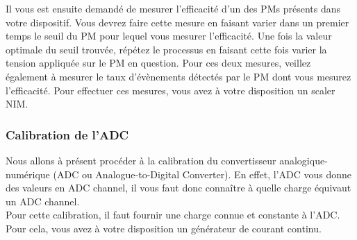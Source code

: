 Il vous est ensuite demandé de mesurer l'efficacité d'un des PMs présents dans votre dispositif. Vous devrez faire cette mesure en faisant varier dans un premier temps le seuil du PM pour lequel vous mesurer l'efficacité. Une fois la valeur optimale du seuil trouvée, répétez le processus en faisant cette fois varier la tension appliquée sur le PM en question. Pour ces deux mesures, veillez également à mesurer le taux d'évènements détectés par le PM dont vous mesurez l'efficacité. Pour effectuer ces mesures, vous avez à votre disposition un scaler NIM.


\subsubsection{Calibration de l'ADC}

Nous allons à présent procéder à la calibration du convertisseur analogique-numérique (ADC ou Analogue-to-Digital Converter). En effet, l'ADC vous donne des valeurs en ADC channel, il vous faut donc connaître à quelle charge équivaut un ADC channel.\\

Pour cette calibration, il faut fournir une charge connue et constante à l'ADC. Pour cela, vous avez à votre disposition un générateur de courant continu.


